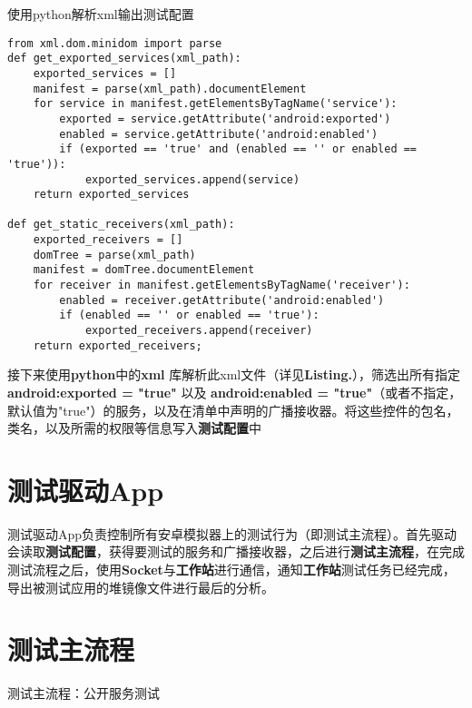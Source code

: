 \begin{listing}[htbp]
	\centering
	\caption{使用python解析xml输出测试配置}
	\begin{verbatim}
from xml.dom.minidom import parse
def get_exported_services(xml_path):
	exported_services = []
	manifest = parse(xml_path).documentElement 
	for service in manifest.getElementsByTagName('service'):
		exported = service.getAttribute('android:exported')
		enabled = service.getAttribute('android:enabled')
		if (exported == 'true' and (enabled == '' or enabled == 'true')):
			exported_services.append(service)
	return exported_services
	
def get_static_receivers(xml_path):
	exported_receivers = []
	domTree = parse(xml_path)
	manifest = domTree.documentElement
	for receiver in manifest.getElementsByTagName('receiver'):
		enabled = receiver.getAttribute('android:enabled')
		if (enabled == '' or enabled == 'true'):
			exported_receivers.append(receiver)
	return exported_receivers;
	\end{verbatim}
	\label{python:get services}	
\end{listing}

接下来使用\textbf{python}中的\textbf{xml} 库解析此xml文件（详见\textbf{Listing.}\redbf{\ref{python:get services}}），筛选出所有指定\textbf{android:exported = "true"} 以及 \textbf{android:enabled = "true"}（或者不指定，默认值为"true"）的服务，以及在清单中声明的广播接收器。将这些控件的包名，类名，以及所需的权限等信息写入\textbf{测试配置}中
\section{测试驱动App}\label{test driver app}
测试驱动App负责控制所有安卓模拟器上的测试行为（即测试主流程\redbf{\ref{main flow}}）。首先驱动会读取\textbf{测试配置}，获得要测试的服务和广播接收器，之后进行\textbf{测试主流程}，在完成测试流程之后，使用\textbf{Socket}与\textbf{工作站}进行通信，通知\textbf{工作站}测试任务已经完成，导出被测试应用的堆镜像文件进行最后的分析。
\section{测试主流程}\label{main flow}

\begin{algorithm}
	\caption{测试主流程：公开服务测试}
	\label{alg:service}
	\begin{algorithmic}[1]
			\ENDIF
				\ELSE
				\ENDIF
			\ENDWHILE
			\ENDIF
		\ENDFOR
	\end{algorithmic}
\end{algorithm}

